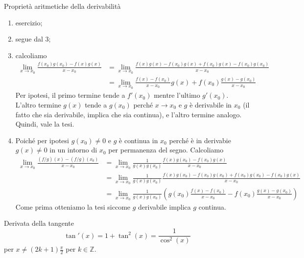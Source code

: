 \documentclass[a4paper]{article}
\begin{document}
\begin{snippetproof}{Proprietà aritmetiche della derivabilità}
    \begin{enumerate}
        \item esercizio;
        \item segue dal 3;
       \item calcoliamo \begin{align*}
           \lim_{x\to x_0} \frac{f(x_0)g(x_0) - f(x)g(x)}{x-x_0}
           &= \lim_{x\to x_0} \frac{f(x)g(x) - f(x_0)g(x) + f(x_0)g(x) - f(x_0)g(x_0)}{x-x_0} \\
           &= \lim_{x\to x_0} \frac{f(x) - f(x_0)}{x-x_0} g(x) + f(x_0) \frac{g(x) - g(x_0)}{x-x_0}
       \end{align*}
        Per ipotesi, il primo termine tende a \(f'(x_0)\) mentre l'ultimo
        \(g'(x_0)\). L'altro termine \(g(x)\) tende a \(g(x_0)\) perché
        \(x \to x_0\) e \(g\) è derivabile in \(x_0\) (il fatto che sia derivabile, implica che sia continua),
        e l'altro termine analogo. Quindi, vale la tesi.
        \item Poiché per ipotesi \(g(x_0) \neq 0\) e \(g\) è continua
        in \(x_0\) perché è in derivabie \(g(x) \neq 0\) in un intorno di \(x_0\)
        per permanenza del segno. Calcoliamo
        \begin{align*}
            \lim_{x\to x_0} \frac{(f/g)(x) - (f/g)(x_0)}{x-x_0}
            &= \lim_{x\to x_0} \frac{1}{g(x)g(x_0)}
            \frac{f(x)g(x_0) - f(x_0)g(x)}{x - x_0} \\
            &= \lim_{x\to x_0} \frac{1}{g(x)g(x_0)}
            \frac{f(x)g(x_0) - f(x_0)g(x_0) + f(x_0)g(x_0) - f(x_0)g(x)}{x-x_0} \\
            &= \lim_{x\to x_0} \frac{1}{g(x)g(x_0)}
            \left(
                g(x_0)\frac{f(x) - f(x_0)}{x-x_0}
                - f(x_0) \frac{g(x) - g(x_0)}{x-x_0}
            \right)
        \end{align*}
        Come prima otteniamo la tesi siccome \(g\) derivabile implica \(g\) continua.
    \end{enumerate}
\end{snippetproof}

\begin{snippetproposition}{Derivata della tangente}
    \[
        \tan'(x) = 1 + \tan^2(x) = \frac{1}{\cos^2(x)}
    \]
    per \(x \neq (2k+1)\frac{\pi}{2}\) per \(k \in \mathbb{Z}\).
\end{snippetproposition}
\end{document}
